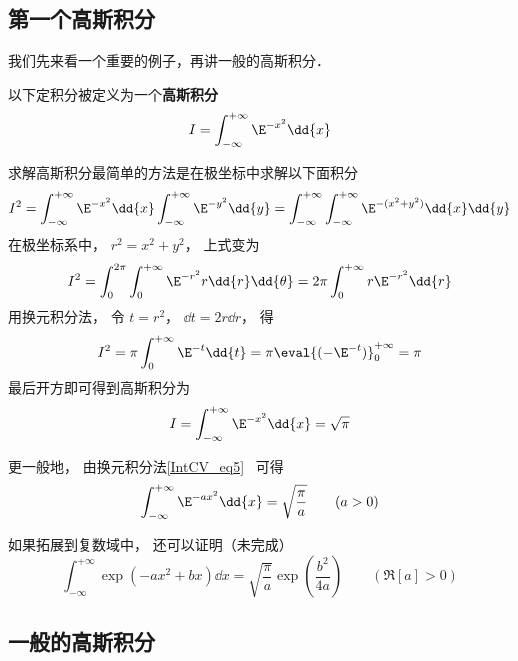 

\subsection{第一个高斯积分}

我们先来看一个重要的例子，再讲一般的高斯积分．

以下定积分被定义为一个\textbf{高斯积分}
\begin{equation}
I = \int_{-\infty}^{+\infty} \E^{-x^2}\dd{x}
\end{equation}

求解高斯积分最简单的方法是在极坐标中求解以下面积分
\begin{equation}
I^2 = \int_{-\infty}^{+\infty} \E^{-x^2}\dd{x} \int_{-\infty}^{+\infty} \E^{-y^2}\dd{y}
=\int_{-\infty}^{+\infty}\int_{-\infty}^{+\infty} \E^{-(x^2 + y^2)} \dd{x}\dd{y}
\end{equation}
在极坐标系中， $r^2 = x^2 + y^2$， 上式变为
\begin{equation}
I^2 = \int_0^{2\pi} \int_0^{+\infty} \E^{-r^2} r\dd{r}\dd{\theta}
= 2\pi \int_0^{+\infty} r\E^{-r^2} \dd{r}
\end{equation}
用换元积分法， 令 $t = r^2$， $\dd{t} = 2r\dd{r}$， 得
\begin{equation}
I^2 = \pi \int_0^{+\infty} \E^{-t} \dd{t} = \pi \eval{(-\E^{-t})}_0^{+\infty} = \pi
\end{equation}
最后开方即可得到高斯积分为
\begin{equation}\label{GsInt_eq1}
I = \int_{-\infty}^{+\infty} \E^{-x^2}\dd{x} = \sqrt{\pi}
\end{equation}

更一般地， 由换元积分法\autoref{IntCV_eq5}~ 可得
\begin{equation}
\int_{-\infty}^{+\infty} \E^{-a x^2}\dd{x} = \sqrt{\frac{\pi}{a}} \qquad (a > 0)
\end{equation}

如果拓展到复数域中， 还可以证明（未完成）
\begin{equation}\label{GsInt_eq4}
\int_{-\infty}^{+\infty} \exp(-ax^2 + bx) \dd{x} = \sqrt{\frac{\pi}{a}} \exp(\frac{b^2}{4a}) \qquad (\Re[a] > 0)
\end{equation}


\subsection{一般的高斯积分}

